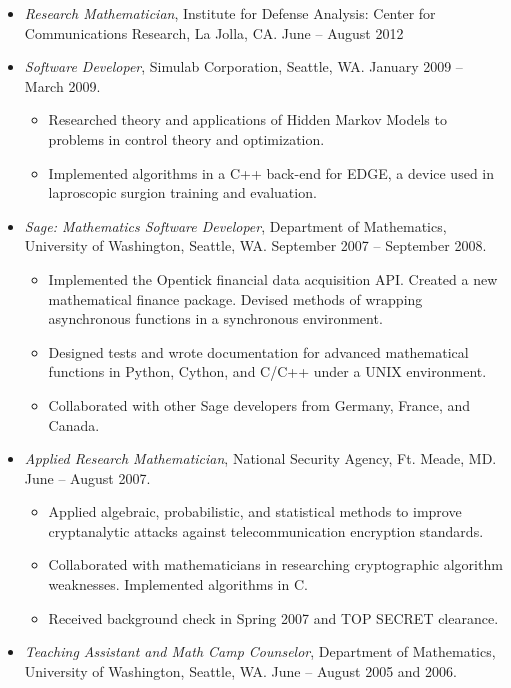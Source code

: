 \documentclass{article}
\begin{document}
\begin{itemize}
  \item {\it Research Mathematician}, Institute for Defense Analysis:
    Center for Communications Research, La Jolla, CA. June – August 2012
  \item {\it Software Developer}, Simulab Corporation, Seattle,
    WA. January 2009 -- March 2009.
    \begin{itemize}
    \item Researched theory and applications of Hidden Markov Models to problems
      in control theory and optimization.
    \item Implemented algorithms in a C++ back-end for EDGE, a device used in
      laproscopic surgion training and evaluation.
    \end{itemize}
  \item {\it Sage: Mathematics Software Developer}, Department of
    Mathematics, University of Washington, Seattle, WA. September 2007
    -- September 2008.
    \begin{itemize}
    \item Implemented the Opentick financial data acquisition API. Created a new
      mathematical finance package. Devised methods of wrapping asynchronous
      functions in a synchronous environment.
    \item Designed tests and wrote documentation for advanced mathematical
      functions in Python, Cython, and C/C++ under a UNIX environment.
    \item Collaborated with other Sage developers from Germany, France, and
      Canada.
    \end{itemize}
  \item {\it Applied Research Mathematician}, National Security Agency,
    Ft. Meade, MD. June -- August 2007.
    \begin{itemize}
    \item Applied algebraic, probabilistic, and statistical methods to improve
      cryptanalytic attacks against telecommunication encryption standards.
    \item Collaborated with mathematicians in researching cryptographic
      algorithm weaknesses. Implemented algorithms in C.
    \item Received background check in Spring 2007 and TOP SECRET clearance.
    \end{itemize}
  \item {\it Teaching Assistant and Math Camp Counselor}, Department of
    Mathematics, University of Washington, Seattle, WA. June -- August 2005 and
    2006.
\end{itemize}
\end{document}
